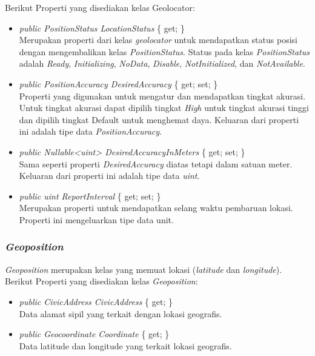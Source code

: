 Berikut Properti yang disediakan kelas Geolocator:
\begin{itemize}
	\item \textit{public PositionStatus LocationStatus} \{ get; \} \\
		Merupakan properti dari kelas \textit{geolocator} untuk mendapatkan status posisi dengan mengembalikan kelas \textit{PositionStatus}. Status pada kelas \textit{PositionStatus} adalah \textit{Ready}, \textit{Initializing}, \textit{NoData}, \textit{Disable}, \textit{NotInitialized}, dan \textit{NotAvailable}.
	\item \textit{public PositionAccuracy DesiredAccuracy} \{ get; set; \} \\
		Properti yang digunakan untuk mengatur dan mendapatkan tingkat akurasi. Untuk tingkat akurasi dapat dipilih tingkat \textit{High} untuk tingkat akurasi tinggi dan dipilih tingkat {Default} untuk menghemat daya. Keluaran dari properti ini adalah tipe data \textit{PositionAccuracy}.
	\item \textit{public Nullable<uint> DesiredAccuracyInMeters} \{ get; set; \}\\
		Sama seperti properti \textit{DesiredAccuracy} diatas tetapi dalam satuan meter. Keluaran dari properti ini adalah tipe data \textit{uint}.
	\item \textit{public uint ReportInterval} \{ get; set; \} \\
		Merupakan properti untuk mendapatkan selang waktu pembaruan lokasi. Properti ini mengeluarkan tipe data unit.
\end{itemize}

\subsubsection{\textit{Geoposition}}
\label{subsubsec:Kelas Geoposition}
\hspace{0.5cm} \textit{Geoposition} merupakan kelas yang memuat lokasi (\textit{latitude} dan \textit{longitude}).
Berikut Properti yang disediakan kelas \textit{Geoposition}:
\begin{itemize}
	\item \textit{public CivicAddress CivicAddress} \{ get; \} \\
		Data alamat sipil yang terkait dengan lokasi geografis.
	\item \textit{public Geocoordinate Coordinate} \{ get; \} \\
		Data latitude dan longitude yang terkait lokasi geografis.
\end{itemize}

